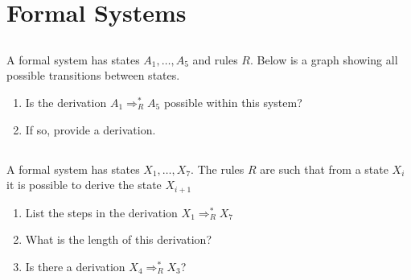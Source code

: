\documentclass[twocolumn]{article}
\newcommand\mrk[1]{}
\begin{document}
\section{Formal Systems}

\subsection{}

    A formal system has states $A_1, \dots, A_5$ and rules $R$. Below is a graph showing all possible transitions between states.

    \begin{figure}[h!]
        \centering
    \end{figure}

    \begin{enumerate}
        \item Is the derivation $A_1 \Rightarrow^*_R A_5$ possible within this system? \mrk{1}
        \item If so, provide a derivation. \mrk{1}
    \end{enumerate}

\subsection{}

    A formal system has states $X_1, \dots, X_{7}$. The rules $R$ are such that from a state $X_i$ it is possible to derive the state $X_{i+1}$

    \begin{enumerate}
        \item List the steps in the derivation $X_1 \Rightarrow^*_R X_7$ \mrk{1}
        \item What is the length of this derivation? \mrk{1}
        \item Is there a derivation $X_4 \Rightarrow^*_R X_3$? \mrk{1}
    \end{enumerate}
\end{document}

